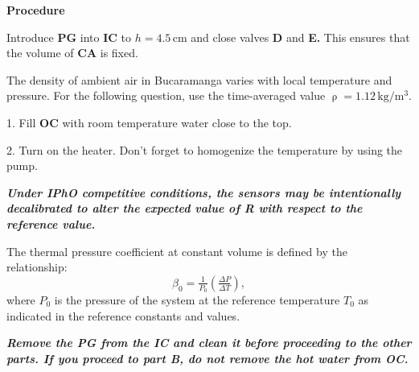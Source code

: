\textbf{Procedure}

Introduce \textbf{PG} into \textbf{IC} to $h = 4.5\,\mathrm{cm}$ and close
valves \textbf{D} and \textbf{E.} This ensures that the volume of \textbf{CA}
is fixed.

The density of ambient air in Bucaramanga varies with local temperature and
pressure. For the following question, use the time-averaged value
$\uprho = 1.12\,\mathrm{kg/m^3}$.

\noindent{}

1. Fill \textbf{OC} with room temperature water close to the top.

2. Turn on the heater. Don't forget to homogenize the temperature by using the
pump.

\noindent{}

\noindent{}

\textbf{\textit{Under IPhO competitive conditions, the sensors may be
intentionally decalibrated to alter the expected value of R with respect to the
reference value.}}

\noindent{}

The thermal pressure coefficient at constant volume is defined by the
relationship:
\begin{equation}
\beta_0 = \tfrac{1}{P_0}\left(\tfrac{\Delta P}{\Delta T}\right), \tag{2}
\end{equation}
where $P_0$ is the pressure of the system at the reference temperature $T_0$
as indicated in the reference constants and values.

\noindent{}

\textbf{\textit{Remove the PG from the IC and clean it before proceeding to the
other parts. If you proceed to part B, do not remove the hot water from OC.}}

